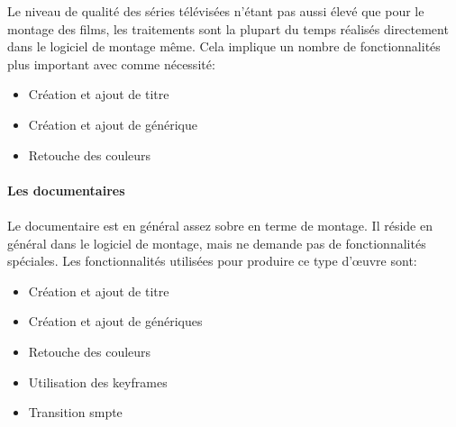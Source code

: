 Le niveau de qualité des séries télévisées n'étant pas aussi élevé
que pour le montage des films, les traitements sont la plupart du temps
réalisés directement dans le logiciel de montage même. Cela implique
un nombre de fonctionnalités plus important avec comme nécessité:

\begin{itemize} \setlength{\itemsep}{2mm}

  \item{Création et ajout de titre}

  \item{Création et ajout de générique}

  \item{Retouche des couleurs}

\end{itemize}

\paragraph {Les documentaires}

\paragraph{}

Le documentaire est en général assez sobre en terme de montage. Il
réside en général dans le logiciel de montage, mais ne demande pas
de fonctionnalités spéciales. Les fonctionnalités utilisées pour
produire ce type d'œuvre sont:

\begin{itemize} \setlength{\itemsep}{2mm}

  \item{Création et ajout de titre}

  \item{Création et ajout de génériques}

  \item{Retouche des couleurs}

  \item{Utilisation des keyframes}

  \item{Transition smpte }

\end{itemize}

